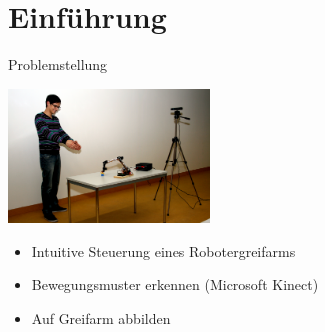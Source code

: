 \section{Einführung}

\begin{frame}{Problemstellung}
\begin{center}
	\includegraphics[width=0.4\textwidth]{imgs/aufbau.jpg}
\end{center}	
\begin{itemize}
	\item Intuitive Steuerung eines Robotergreifarms
	\item Bewegungsmuster erkennen (Microsoft Kinect)
	\item Auf Greifarm abbilden
	\end{itemize}
\end{frame}